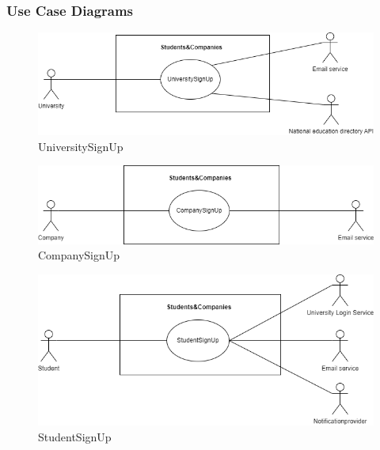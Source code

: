\documentclass{article}
\begin{document}
\subsubsection{Use Case Diagrams}
\begin{figure}[H]
    \centering
    \includegraphics[scale = 0.45]{figures/UseCasesDiagrams/UniversityLogin.drawio.png}
    \caption{UniversitySignUp}
    \centering
\end{figure}
\begin{figure}[H]
    \centering
    \includegraphics[scale = 0.45]{figures/UseCasesDiagrams/CompanySignUp.drawio.png}
    \caption{CompanySignUp}
    \centering
\end{figure}
\begin{figure}[H]
    \centering
    \includegraphics[scale = 0.45]{figures/UseCasesDiagrams/StudentSignUp.drawio.png}
    \caption{StudentSignUp}
    \centering
\end{figure}
\end{document}
